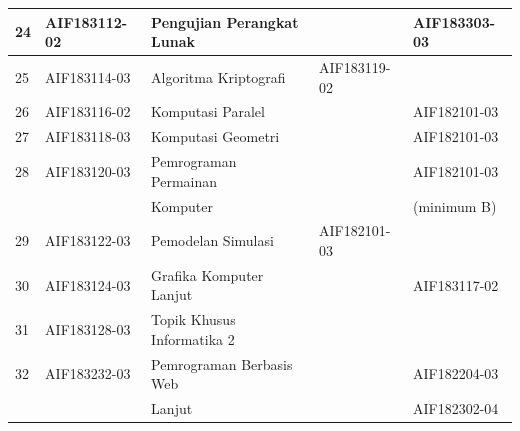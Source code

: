 \begin{table}[H]
\begin{tabular}{|p{0.5cm}|p{2.85cm}|p{4.95cm}|p{2.7cm}|p{2.7cm}|}
24 & AIF183112-02 & Pengujian Perangkat Lunak                                        &              & AIF183303-03       \\ \hline
25 & AIF183114-03 & Algoritma Kriptografi                                            & AIF183119-02 &                    \\ \hline
26 & AIF183116-02 & Komputasi Paralel                                                &              & AIF182101-03       \\ \hline
27 & AIF183118-03 & Komputasi Geometri                                               &              & AIF182101-03       \\ \hline
28 & AIF183120-03 & Pemrograman Permainan                                            &              & AIF182101-03       \\ 
   &              & Komputer                                                         &              & (minimum B)        \\ \hline
29 & AIF183122-03 & Pemodelan Simulasi                                               & AIF182101-03 &                    \\ \hline
30 & AIF183124-03 & Grafika Komputer Lanjut                                          &              & AIF183117-02       \\ \hline
31 & AIF183128-03 & Topik Khusus Informatika 2                                       &              &                    \\ \hline
32 & AIF183232-03 & Pemrograman Berbasis Web                                         &              & AIF182204-03       \\ 
   &              & Lanjut                                                           &              & AIF182302-04       \\ \hline
					\end{tabular}
	\label{tab:DaftarMataKuliahPilihanDanPrasyaratnya}
\end{table}

